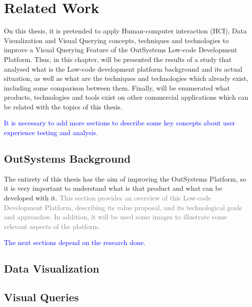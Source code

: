 \chapter{Related Work}
\label{cha:related_work}
On this thesis, it is pretended to apply Human-computer interaction (HCI), Data Visualization and Visual Querying concepts, techniques and technologies to improve a Visual Querying Feature of the OutSystems Low-code Development Platform. Thus, in this chapter, will be presented the results of a study that analysed what is the Low-code development platform background and its actual situation, as well as what are the techniques and technologies which already exist, including some comparison between them. Finally, will be enumerated what products, technologies and tools exist on other commercial applications which can be related with the topics of this thesis.

\textcolor{blue}{It is necessary to add more sections to describe some key concepts about user experience testing and analysis.}

\section{OutSystems Background}
\label{sec:outsystems_background}
The entirety of this thesis has the aim of improving the OutSystems Platform, so it is very important to understand what is that product and what can be developed with it.
\textcolor{gray}{This section provides an overview of this Low-code Development Platform, describing its value proposal, and its technological goals and approaches. In addition, it will be used some images to illustrate some relevant aspects of the platform.}

\textcolor{blue}{The next sections depend on the research done.}

\section{Data Visualization}
\label{sec:data_visualization}

\section{Visual Queries}
\label{sec:visual_queries}

